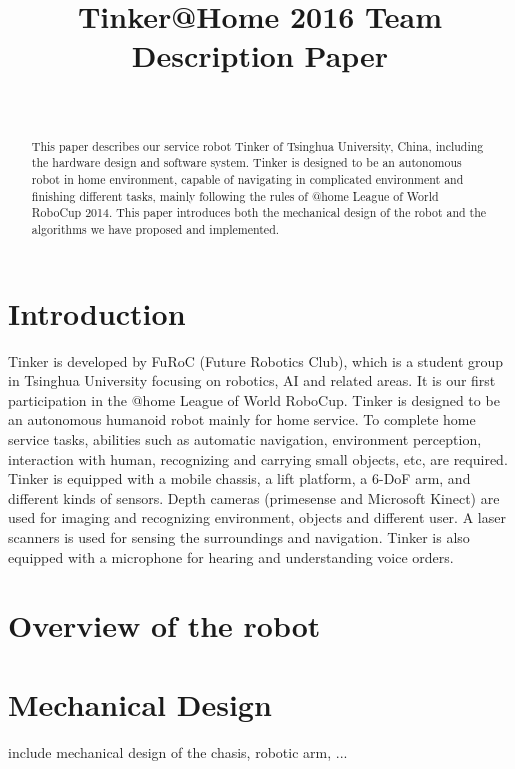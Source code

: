 \documentclass[journal,12pt,onecolumn]{IEEEtran}
\begin{document}
	
\title{Tinker@Home 2016 Team Description Paper}
\author{\\
}
\maketitle


\begin{abstract}
This paper describes our service robot Tinker of Tsinghua University, China, including the hardware design and software system. Tinker is designed to be an autonomous robot in home environment, capable of navigating in complicated environment and finishing different tasks, mainly following the rules of @home League of World RoboCup 2014. This paper introduces both the mechanical design of the robot and the algorithms we have proposed and implemented.
\end{abstract}



\section{Introduction}
Tinker is developed by FuRoC (Future Robotics Club), which is a student group in Tsinghua University focusing on robotics, AI and related areas. It is our first participation in the @home League of World RoboCup. Tinker is designed to be an autonomous humanoid robot mainly for home service. To complete home service tasks, abilities such as automatic navigation, environment perception, interaction with human, recognizing and carrying small objects, etc, are required. Tinker is equipped with a mobile chassis, a lift platform, a 6-DoF arm, and different kinds of sensors. Depth cameras (primesense and Microsoft Kinect) are used for imaging and recognizing environment, objects and different user. A laser scanners is used for sensing the surroundings and navigation. Tinker is also equipped with a microphone for hearing and understanding voice orders.

\section{Overview of the robot}

\section{Mechanical Design}
include mechanical design of the chasis, robotic arm, ...

\end{document}

